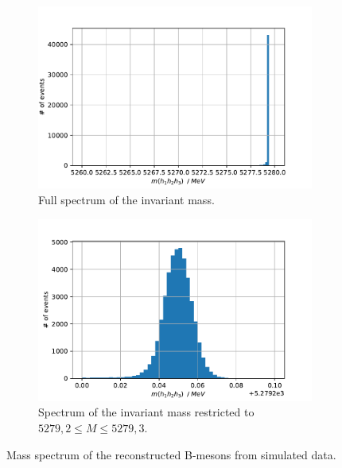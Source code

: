 \begin{figure}[H]
        \centering
        \begin{subfigure}{0.49\textwidth}
          \includegraphics[width=\textwidth]{plots/mass_B_sim.pdf}
          \caption{Full spectrum of the invariant mass.}
          \label{fig:ProbPi}
        \end{subfigure}
        \begin{subfigure}{0.49\textwidth}
          \includegraphics[width=\textwidth]{plots/masspeak_B_sim.pdf}
          \caption{Spectrum of the invariant mass restricted to $5279,2 \leq M \leq 5279,3$.}
          \label{fig:ProbK}
        \end{subfigure}
        \caption{Mass spectrum of the reconstructed B-mesons from simulated data.}
        \label{f2}
\end{figure}

